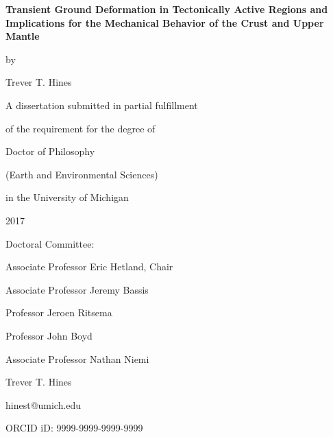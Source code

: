 \documentclass[letterpaper,12pt,oneside]{book}
\begin{document}
\frontmatter %

\thispagestyle{empty} %
\begin{singlespacing} %
\begin{center}
\vspace*{1.5in}
\textbf{\large{Transient Ground Deformation in Tectonically Active
Regions and Implications for the Mechanical Behavior of the Crust and
Upper Mantle}}

\vspace*{0.2in}
by

\vspace*{0.2in}
Trever T. Hines 

\vspace*{1.0in}
A dissertation submitted in partial fulfillment

of the requirement for the degree of 

Doctor of Philosophy

(Earth and Environmental Sciences)

in the University of Michigan

2017
\end{center}
\vspace*{1.5in}
Doctoral Committee:

\vspace*{0.1in}
\hspace*{0.2in}
Associate Professor Eric Hetland, Chair

\hspace*{0.2in}
Associate Professor Jeremy Bassis

\hspace*{0.2in}
Professor Jeroen Ritsema

\hspace*{0.2in}
Professor John Boyd

\hspace*{0.2in}
Associate Professor Nathan Niemi

\end{singlespacing}
\newpage

\thispagestyle{empty} %
\begin{center}
\vspace*{1.0in}
Trever T. Hines

hinest@umich.edu

ORCID iD: 9999-9999-9999-9999
\end{center}
\newpage
\end{document}
